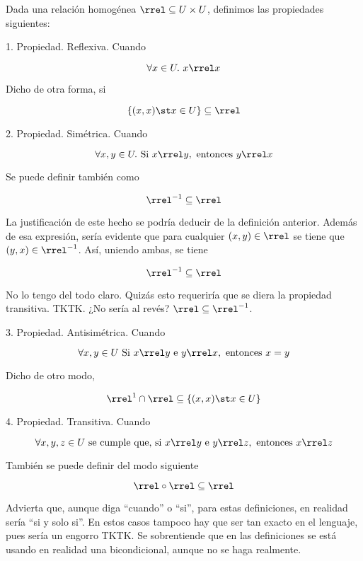 



Dada una relación homogénea $\rrel \subseteq U \times U$, definimos las
propiedades siguientes:

1. Propiedad. Reflexiva. Cuando

\[ \forall x \in U. \ x \rrel x \]

\noindent Dicho de otra forma, si

\[ \{(x, x) \st x \in U\} \subseteq \rrel \]

2. Propiedad. Simétrica. Cuando

$$ \forall x, y \in U. \ \text{Si} \ x \rrel y, \ \text{entonces} \ y \rrel
x $$

\noindent Se puede definir también como

\[ \rrel^{-1} \subseteq \rrel \]

La justificación de este hecho se podría deducir de la definición anterior.
Además de esa expresión, sería evidente que para cualquier $(x, y) \in
\rrel$ se tiene que $(y, x) \in \rrel^{-1}$. Así, uniendo ambas, se tiene

\[ \rrel^{-1} \subseteq \rrel \]


No lo tengo del todo claro. Quizás esto requeriría que se diera la propiedad
transitiva. TKTK. ¿No sería al revés? $\rrel \subseteq \rrel^{-1}$.

3. Propiedad. Antisimétrica. Cuando

\[ \forall x, y \in U \ \text{Si} \ x \rrel y \ \text{e} \ y \rrel x, \
\text{entonces} \ x = y \]

\noindent Dicho de otro modo,

\[ \rrel^{1} \cap \rrel \subseteq \{(x, x) \st x \in U\} \]

4. Propiedad. Transitiva. Cuando

\[ \forall x, y, z \in U \ \text{se cumple que, si} \ x \rrel y \ \text{e} \
y \rrel z, \ \text{entonces} \ x \rrel z \]

\noindent También se puede definir del modo siguiente

\[ \rrel \circ \rrel \subseteq \rrel \]

Advierta que, aunque diga ``cuando'' o ``si'', para estas definiciones, en
realidad sería ``si y solo si''. En estos casos tampoco hay que ser tan
exacto en el lenguaje, pues sería un engorro TKTK. Se sobrentiende que en
las definiciones se está usando en realidad una bicondicional, aunque no se
haga realmente.


